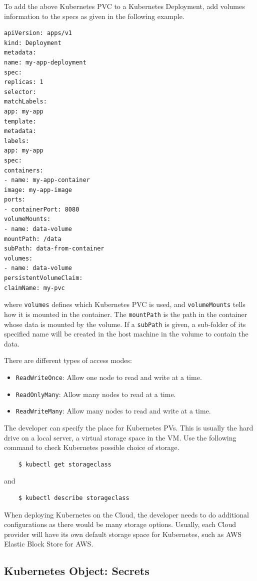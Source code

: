 To add the above Kubernetes PVC to a Kubernetes Deployment, add volumes information to the specs as given in the following example.
\begin{lstlisting}
apiVersion: apps/v1
kind: Deployment
metadata:
name: my-app-deployment
spec:
replicas: 1
selector:
matchLabels:
app: my-app
template:
metadata:
labels:
app: my-app
spec:
containers:
- name: my-app-container
image: my-app-image
ports:
- containerPort: 8080
volumeMounts:
- name: data-volume
mountPath: /data
subPath: data-from-container
volumes:
- name: data-volume
persistentVolumeClaim:
claimName: my-pvc
\end{lstlisting}
where \verb|volumes| defines which Kubernetes PVC is used, and \verb|volumeMounts| tells how it is mounted in the container. The \verb|mountPath| is the path in the container whose data is mounted by the volume. If a \verb|subPath| is given, a sub-folder of its specified name will be created in the host machine in the volume to contain the data.

There are different types of access modes:
\begin{itemize}
	\item \verb|ReadWriteOnce|: Allow one node to read and write at a time.
	\item \verb|ReadOnlyMany|: Allow many nodes to read at a time.
	\item \verb|ReadWriteMany|: Allow many nodes to read and write at a time.
\end{itemize}

The developer can specify the place for Kubernetes PVs. This is usually the hard drive on a local server, a virtual storage space in the VM. Use the following command to check Kubernetes possible choice of storage.
\begin{lstlisting}
	$ kubectl get storageclass
\end{lstlisting}
and
\begin{lstlisting}
	$ kubectl describe storageclass
\end{lstlisting}
When deploying Kubernetes on the Cloud, the developer needs to do additional configurations as there would be many storage options. Usually, each Cloud provider will have its own default storage space for Kubernetes, such as AWS Elastic Block Store for AWS.

\subsection{Kubernetes Object: Secrets} \label{ch:vac:subsec:k8ssecrets}

